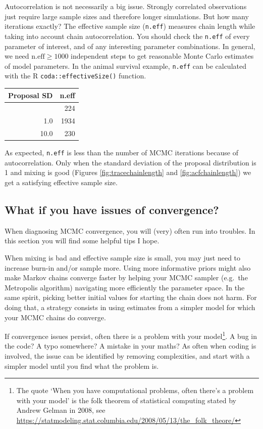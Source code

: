 \documentclass[
  12pt,
]{krantz}
\begin{document}
Autocorrelation is not necessarily a big issue. Strongly correlated observations just require large sample sizes and therefore longer simulations. But how many iterations exactly? The effective sample size (\texttt{n.eff}) measures chain length while taking into account chain autocorrelation. You should check the \texttt{n.eff} of every parameter of interest, and of any interesting parameter combinations. In general, we need \(\text{n.eff} \geq 1000\) independent steps to get reasonable Monte Carlo estimates of model parameters. In the animal survival example, \texttt{n.eff} can be calculated with the R \texttt{coda::effectiveSize()} function.

\begin{longtable}[]{@{}rr@{}}
\toprule\noalign{}
Proposal SD & n.eff \\
\midrule\noalign{}
\endhead
\bottomrule\noalign{}
\endlastfoot
0.1 & 224 \\
1.0 & 1934 \\
10.0 & 230 \\
\end{longtable}

As expected, \texttt{n.eff} is less than the number of MCMC iterations because of autocorrelation. Only when the standard deviation of the proposal distribution is 1 and mixing is good (Figures \ref{fig:tracechainlength} and \ref{fig:acfchainlength}) we get a satisfying effective sample size.

\hypertarget{what-if-you-have-issues-of-convergence}{%
\subsection{What if you have issues of convergence?}\label{what-if-you-have-issues-of-convergence}}

When diagnosing MCMC convergence, you will (very) often run into troubles. In this section you will find some helpful tips I hope.

When mixing is bad and effective sample size is small, you may just need to increase burn-in and/or sample more. Using more informative priors might also make Markov chains converge faster by helping your MCMC sampler (e.g.~the Metropolis algorithm) navigating more efficiently the parameter space. In the same spirit, picking better initial values for starting the chain does not harm. For doing that, a strategy consists in using estimates from a simpler model for which your MCMC chains do converge.

If convergence issues persist, often there is a problem with your model\footnote{The quote `When you have computational problems, often there's a problem with your model' is the folk theorem of statistical computing stated by Andrew Gelman in 2008, see \url{https://statmodeling.stat.columbia.edu/2008/05/13/the_folk_theore/}}. A bug in the code? A typo somewhere? A mistake in your maths? As often when coding is involved, the issue can be identified by removing complexities, and start with a simpler model until you find what the problem is.
\end{document}
